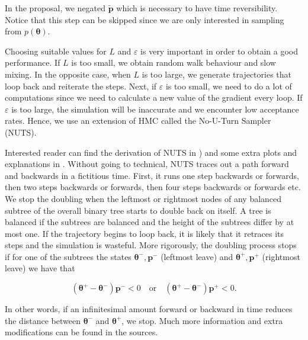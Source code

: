 \documentclass[12pt,a4paper,oneside]{book}
\begin{document}
In the proposal, we negated $\tilde{\bm{p}}$ which is necessary to have time reversibility. Notice that this step can be skipped since we are only interested in sampling from $p(\bm{\theta})$. 

Choosing suitable values for $L$ and $\varepsilon$ is very important in order to obtain a good performance. If $L$ is too small, we obtain random walk behaviour and slow mixing. In the opposite case, when $L$ is too large, we generate trajectories that loop back and reiterate the steps. Next, if $\varepsilon$ is too small, we need to do a lot of computations since we need to calculate a new value of the gradient every loop. If $\varepsilon$ is too large, the simulation will be inaccurate and we encounter low acceptance rates. Hence, we use an extension of HMC called the No-U-Turn Sampler (NUTS). 

Interested reader can find the derivation of NUTS in \cite{hoffman2014no}) and some extra plots and explanations in \cite{betancourt2017conceptual}. Without going to technical, NUTS traces out a path forward and backwards in a fictitious time. First, it runs one step backwards or forwards, then two steps backwards or forwards, then four steps backwards or forwards etc. We stop the doubling when the leftmost or rightmost nodes of any balanced subtree of the overall binary tree starts to double back on itself. A tree is balanced if the subtrees are balanced and the height of the subtrees differ by at most one. If the trajectory begins to loop back, it is likely that it retraces its steps and the simulation is wasteful. More rigorously, the doubling process stops if for one of the subtrees the states $\bm{\theta}^{-}, \bm{p}^{-}$ (leftmost leave) and $\bm{\theta}^{+}, \bm{p}^{+}$ (rightmost leave) we have that 

\begin{equation}
(\bm{\theta}^{+} - \bm{\theta}^{-}) \bm{p}^{-} < 0 \quad \text{or} \quad (\bm{\theta}^{+} - \bm{\theta}^{-}) \bm{p}^{+} <0.
\end{equation}

In other words, if an infinitesimal amount forward or backward in time reduces the distance between $\bm{\theta}^{-}$ and $\bm{\theta}^{+}$, we stop. Much more information and extra modifications can be found in the sources. 









\end{document}
